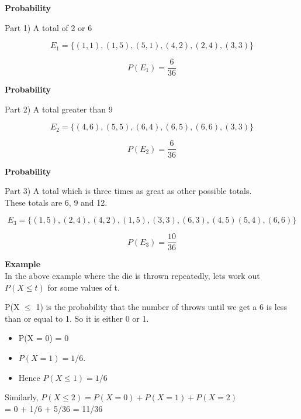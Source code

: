 \documentclass[]{report}
\begin{document}

\noindent \textbf{Probability}

Part 1) A total of 2 or 6

\[ E_1 = \{ (1,1) ,(1,5), (5,1), (4,2), (2,4), (3,3) \}  \]

\[ P(E_1)  = \frac{6}{36} \]



\noindent \textbf{Probability}

Part 2) A total greater than 9 

\[ E_2 = \{ (4,6) , (5,5), (6,4), (6,5), (6,6), (3,3)\}  \]

\[ P(E_2)  = \frac{6}{36} \]



\noindent \textbf{Probability}

Part 3) A total which is three times as great as other possible totals. \\

These totals are 6, 9 and 12.

\[ E_3 = \{ (1,5) , (2,4), (4,2), (1,5), (3,3), (6,3), (4,5) (5,4) , (6,6) \}  \]

\[ P(E_3)  = \frac{10}{36} \]


\textbf{Example}\\

In the above example where the die is thrown repeatedly, lets work out $P(X \leq t)$ for some values of t.

P(X $\leq$ 1) is the probability that the number of throws until we get a 6 is less than or equal to 1. So it is either 0 or 1. 

\begin{itemize}
	\item P(X = 0) = 0 
	\item $P(X = 1) = 1/6$.
	\item  Hence $P(X \leq 1) = 1/6$
\end{itemize}

Similarly, $P(X \leq 2) = P(X = 0) + P(X = 1) + P(X = 2)$\\ = 0 + 1/6 + 5/36 = 11/36
\end{document}
